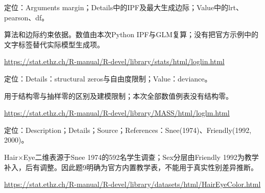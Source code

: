\par\noindent\begin{minipage}{\linewidth}\raggedright{}\label{src:G6-LOGLIN}
\par
定位：Arguments margin；Details中的IPF及最大生成边际；Value中的lrt、pearson、df。\par
算法和边际约束依据。数值由本次Python IPF与GLM复算；没有把官方示例中的文字标签替代实际模型生成项。\par
{\small \url{https://stat.ethz.ch/R-manual/R-devel/library/stats/html/loglin.html}}\par
\end{minipage}\par\medskip

\par\noindent\begin{minipage}{\linewidth}\raggedright{}\label{src:G6-LOGLM}
\par
定位：Details：structural zeros与自由度限制；Value：deviance。\par
用于结构零与抽样零的区别及建模限制；本次全部数值例表没有结构零。\par
{\small \url{https://stat.ethz.ch/R-manual/R-devel/library/MASS/html/loglm.html}}\par
\end{minipage}\par\medskip

\par\noindent\begin{minipage}{\linewidth}\raggedright{}\label{src:G6-HAIR}
\par
定位：Description；Details；Source；References：Snee(1974)、Friendly(1992, 2000)。\par
Hair×Eye二维表源于Snee 1974的592名学生调查；Sex分层由Friendly 1992为教学补入，后有调整。因此题9明确为官方内置教学表，不能用于真实性别差异推断。\par
{\small \url{https://stat.ethz.ch/R-manual/R-devel/library/datasets/html/HairEyeColor.html}}\par
\end{minipage}\par\medskip

